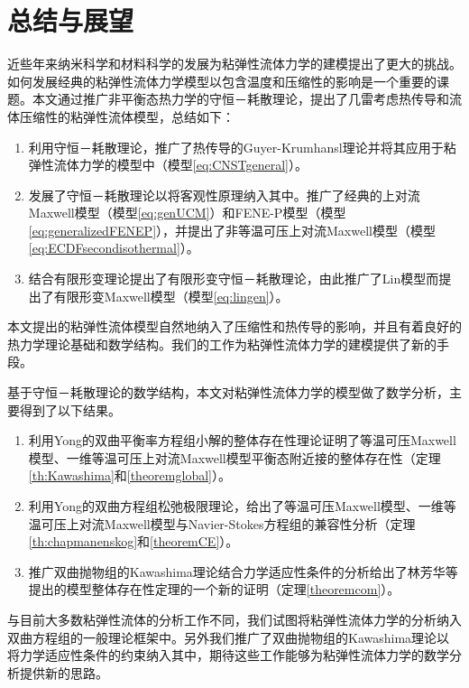\chapter{总结与展望}

% 
近些年来纳米科学和材料科学的发展为粘弹性流体力学的建模提出了更大的挑战。如何发展经典的粘弹性流体力学模型以包含温度和压缩性的影响是一个重要的课题。本文通过推广非平衡态热力学的守恒－耗散理论，提出了几雷考虑热传导和流体压缩性的粘弹性流体模型，总结如下：
\begin{enumerate}
	\item 利用守恒－耗散理论，推广了热传导的Guyer-Krumhansl理论并将其应用于粘弹性流体力学的模型中（模型\eqref{eq:CNSTgeneral}）。
	\item 发展了守恒－耗散理论以将客观性原理纳入其中。推广了经典的上对流Maxwell模型（模型\eqref{eq:genUCM}）和FENE-P模型（模型\eqref{eq:generalizedFENEP}），并提出了非等温可压上对流Maxwell模型（模型\eqref{eq:ECDFsecondisothermal}）。
	\item 结合有限形变理论提出了有限形变守恒－耗散理论，由此推广了Lin模型而提出了有限形变Maxwell模型（模型\eqref{eq:lingen}）。
\end{enumerate}
本文提出的粘弹性流体模型自然地纳入了压缩性和热传导的影响，并且有着良好的热力学理论基础和数学结构。我们的工作为粘弹性流体力学的建模提供了新的手段。

基于守恒－耗散理论的数学结构，本文对粘弹性流体力学的模型做了数学分析，主要得到了以下结果。
\begin{enumerate}
	\item 利用Yong的双曲平衡率方程组小解的整体存在性理论证明了等温可压Maxwell模型、一维等温可压上对流Maxwell模型平衡态附近接的整体存在性（定理\ref{th:Kawashima}和\ref{theoremglobal}）。
	\item 利用Yong的双曲方程组松弛极限理论，给出了等温可压Maxwell模型、一维等温可压上对流Maxwell模型与Navier-Stokes方程组的兼容性分析（定理\ref{th:chapmanenskog}和\ref{theoremCE}）。
	\item 推广双曲抛物组的Kawashima理论结合力学适应性条件的分析给出了林芳华等提出的模型整体存在性定理的一个新的证明（定理\ref{theoremcom}）。
\end{enumerate}
与目前大多数粘弹性流体的分析工作不同，我们试图将粘弹性流体力学的分析纳入双曲方程组的一般理论框架中。另外我们推广了双曲抛物组的Kawashima理论以将力学适应性条件的约束纳入其中，期待这些工作能够为粘弹性流体力学的数学分析提供新的思路。


